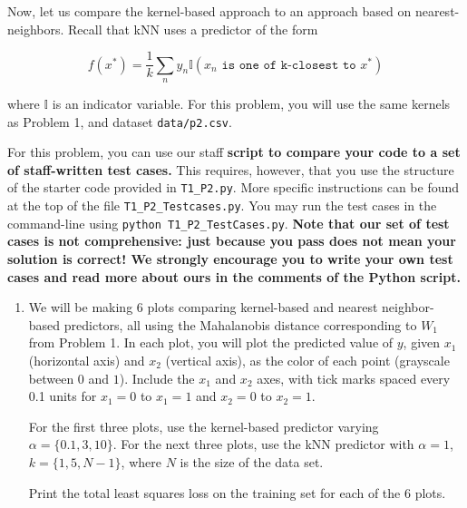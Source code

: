 \documentclass[submit]{harvardml}
\begin{document}
\newpage



\begin{problem}

Now, let us compare the kernel-based approach to an approach based on
nearest-neighbors.  Recall that kNN uses a predictor of the form

  \begin{equation*}
    f(x^*) = \frac{1}{k} \sum_n y_n \mathbb{I}(x_n \texttt{ is one of k-closest to } x^*)
  \end{equation*}

\noindent where $\mathbb{I}$ is an indicator variable. For this problem, you will use the same kernels as Problem 1, and dataset \verb|data/p2.csv|. 

For this problem, you can use our staff \textbf{script to compare your code to a set of staff-written test cases.} This requires, however, that you use the structure of the starter code provided in \texttt{T1\_P2.py}. More specific instructions can be found at the top of the file \texttt{T1\_P2\_Testcases.py}. You may run the test cases in the command-line using \texttt{python T1\_P2\_TestCases.py}.
\textbf{Note that our set of test cases is not comprehensive: just because you pass does not mean your solution is correct! We strongly encourage you to write your own test cases and read more about ours in the comments of the Python script.}


\begin{enumerate}

\item We will be making 6 plots comparing kernel-based and nearest
  neighbor-based predictors, all using the Mahalanobis distance
  corresponding to $W_1$ from Problem 1. In each plot, you will plot
  the predicted value of $y$, given $x_1$ (horizontal axis) and $x_2$
  (vertical axis), as the color of each point (grayscale
  between $0$ and $1$). Include the $x_1$ and $x_2$ axes, with tick marks spaced every 0.1 units
  for $x_1=0$ to $x_1=1$ and $x_2=0$ to $x_2=1$.
  
  For the first three plots, use the kernel-based predictor varying
  $\alpha = \{0.1,3,10\}$.  For the next three plots, use the kNN
  predictor with $\alpha = 1$, $k=\{1,5,N-1\}$, where $N$ is the size
  of the data set.

  Print the total least squares loss on the training set for each of
  the 6 plots.
  

\end{enumerate}
\end{problem}
\end{document}
